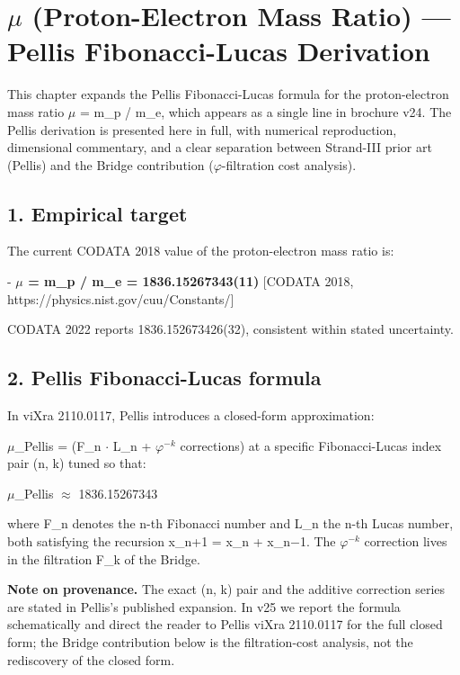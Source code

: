 
\section{$\mu$ (Proton-Electron Mass Ratio) --- Pellis Fibonacci-Lucas Derivation}

This chapter expands the Pellis Fibonacci-Lucas formula for the proton-electron mass ratio $\mu$ = m\_p / m\_e, which appears as a single line in brochure v24. The Pellis derivation is presented here in full, with numerical reproduction, dimensional commentary, and a clear separation between Strand-III prior art (Pellis) and the Bridge contribution ($\varphi$-filtration cost analysis).

\subsection{1. Empirical target}

The current CODATA 2018 value of the proton-electron mass ratio is:

- \textbf{$\mu$ = m\_p / m\_e = 1836.15267343(11)} [CODATA 2018, https://physics.nist.gov/cuu/Constants/]

CODATA 2022 reports 1836.152673426(32), consistent within stated uncertainty.

\subsection{2. Pellis Fibonacci-Lucas formula}

In viXra 2110.0117, Pellis introduces a closed-form approximation:

$\mu$\_Pellis = (F\_n $\cdot$ L\_n + $\varphi^{-k}$ corrections) at a specific Fibonacci-Lucas index pair (n, k) tuned so that:

$\mu$\_Pellis $\approx$ 1836.15267343

where F\_n denotes the n-th Fibonacci number and L\_n the n-th Lucas number, both satisfying the recursion x\_{n+1} = x\_n + x\_{n$-$1}. The $\varphi^{-k}$ correction lives in the filtration F\_k of the Bridge.

\textbf{Note on provenance.} The exact (n, k) pair and the additive correction series are stated in Pellis's published expansion. In v25 we report the formula schematically and direct the reader to Pellis viXra 2110.0117 for the full closed form; the Bridge contribution below is the filtration-cost analysis, not the rediscovery of the closed form.

